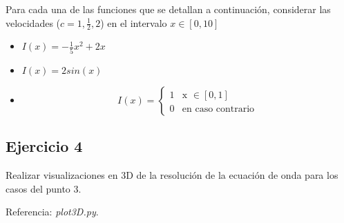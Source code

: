\documentclass[a4paper]{article}
\begin{document}
\smallskip

Para cada una de las funciones que se detallan a continuación, 
considerar las velocidades ($c = 1, \frac{1}{2}, 2$) en el intervalo $x 
\in [0,10]$

\begin{itemize}
\item $I(x) = -\frac{1}{5} x^2 + 2 x$
\item $I(x) = 2 sin(x)$
\item \begin{equation}
  I(x) =
    \begin{cases}
      1 & \text{x $\in [0,1]$}\\
      0 & \text{en caso contrario}
    \end{cases}       
\end{equation}
\end{itemize}

\subsection{Ejercicio 4}
Realizar visualizaciones en 3D de la resolución de la ecuación de 
onda para los casos del punto 3.

\bigskip

Referencia: \emph{plot3D.py}.

 
\end{document}

